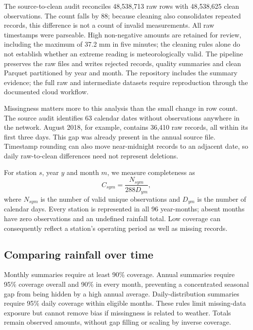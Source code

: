 The source-to-clean audit reconciles 48,538,713 raw rows with 48,538,625 clean observations. The count falls by 88; because cleaning also consolidates repeated records, this difference is not a count of invalid measurements. All raw timestamps were parseable. High non-negative amounts are retained for review, including the maximum of 37.2 mm in five minutes; the cleaning rules alone do not establish whether an extreme reading is meteorologically valid. The pipeline preserves the raw files and writes rejected records, quality summaries and clean Parquet partitioned by year and month. The repository includes the summary evidence; the full raw and intermediate datasets require reproduction through the documented cloud workflow.

Missingness matters more to this analysis than the small change in row count. The source audit identifies 63 calendar dates without observations anywhere in the network. August 2018, for example, contains 36,410 raw records, all within its first three days. This gap was already present in the annual source file. Timestamp rounding can also move near-midnight records to an adjacent date, so daily raw-to-clean differences need not represent deletions.

For station $s$, year $y$ and month $m$, we measure completeness as
\[
 C_{sym}=\frac{N_{sym}}{288D_{ym}},
\]
where $N_{sym}$ is the number of valid unique observations and $D_{ym}$ is the number of calendar days. Every station is represented in all 96 year-months; absent months have zero observations and an undefined rainfall total. Low coverage can consequently reflect a station's operating period as well as missing records.


\subsection{Comparing rainfall over time}
Monthly summaries require at least 90\% coverage. Annual summaries require 95\% coverage overall and 90\% in every month, preventing a concentrated seasonal gap from being hidden by a high annual average. Daily-distribution summaries require 95\% daily coverage within eligible months. These rules limit missing-data exposure but cannot remove bias if missingness is related to weather. Totals remain observed amounts, without gap filling or scaling by inverse coverage.

